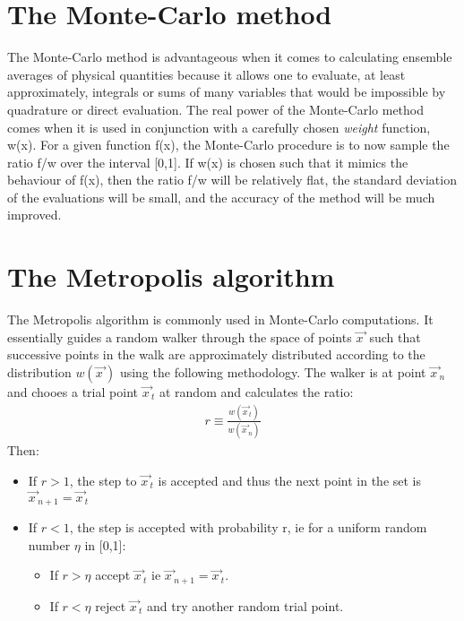 \documentclass[a4paper]{article}
\begin{document}
\section{The Monte-Carlo method}\label{Monte-Carlo}
The Monte-Carlo method is advantageous when it comes to calculating ensemble averages of physical quantities because it allows one to evaluate, at least approximately, integrals or sums of many variables that would be impossible by quadrature or direct evaluation. The real power of the Monte-Carlo method comes when it is used in conjunction with a carefully chosen \emph{weight} function, w(x). For a given function f(x), the Monte-Carlo procedure is to now sample the ratio f/w over the interval [0,1]. If w(x) is chosen such that it mimics the behaviour of f(x), then the ratio f/w will be relatively flat, the standard deviation of the evaluations will be small, and the accuracy of the method will be much improved.\\

\section{The Metropolis algorithm}\label{Metro_algo}
The Metropolis algorithm is commonly used in Monte-Carlo computations. It essentially guides a random walker through the space of points $\overrightarrow{x\,}$ such that successive points in the walk are approximately distributed according to the distribution $w(\overrightarrow{x\,})$ using the following methodology. The walker is at point $\overrightarrow{x\,}_n$ and chooes a trial point $\overrightarrow{x\,}_t$ at random and calculates the ratio:
\begin{align}
	r\equiv\frac{w(\overrightarrow{x\,}_t)}{w(\overrightarrow{x\,}_n)}
\end{align}
\noindent Then:
\begin{itemize}
	\item If $r>1$, the step to $\overrightarrow{x\,}_t$ is accepted and thus the next point in the set is $\overrightarrow{x\,}_{n+1}=\overrightarrow{x\,}_t$
	\item If $r<1$, the step is accepted with probability r, ie for a uniform random number $\eta$ in [0,1]:
	\begin{itemize}
		\item If $r>\eta$ accept $\overrightarrow{x\,}_t$ ie $\overrightarrow{x\,}_{n+1}=\overrightarrow{x\,}_t$.
		\item If $r<\eta$ reject $\overrightarrow{x\,}_t$ and try another random trial point.
	\end{itemize}
\end{itemize}
\end{document}
